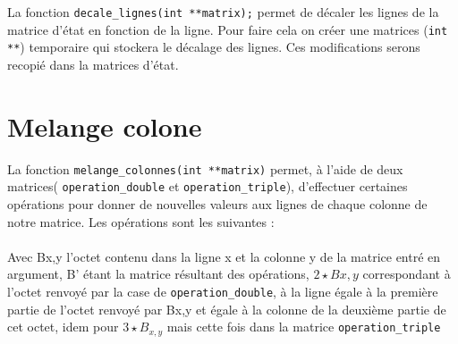 \documentclass[10pt, a4paper]{report}
\begin{document}
	La fonction \verb|decale_lignes(int **matrix);| permet de décaler les lignes de la matrice d'état en fonction de la ligne. Pour faire cela on créer une matrices (\verb|int **|) temporaire qui stockera le décalage des lignes. Ces modifications serons recopié dans la matrices d'état.
	
	\section{Melange colone}
	
	La fonction \verb|melange_colonnes(int **matrix)| permet, à l'aide de deux matrices( \verb|operation_double| et \verb|operation_triple|), d'effectuer certaines opérations pour donner de nouvelles valeurs aux lignes de chaque colonne de notre matrice. Les opérations sont les suivantes : \\\\
	Avec B{x,y} l'octet contenu dans la ligne x et la colonne y de la matrice entré en argument, B' étant la matrice résultant des opérations,
	\begin{math}
		2\star B{x,y}  
	\end{math}
	correspondant à l'octet renvoyé par la case de \verb|operation_double|, à la ligne égale à la première partie de l'octet renvoyé par B{x,y} et égale à la colonne de la deuxième partie de cet octet, idem pour 
	\begin{math}
		3\star B_{x,y} 
	\end{math}
	mais cette fois dans la matrice \verb|operation_triple|
\end{document}
